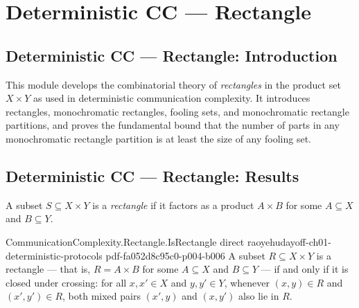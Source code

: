 \section{Deterministic CC --- Rectangle}
\subsection*{Deterministic CC --- Rectangle: Introduction}

This module develops the combinatorial theory of \emph{rectangles} in the product
set $X \times Y$ as used in deterministic communication complexity.  It introduces
rectangles, monochromatic rectangles, fooling sets, and monochromatic rectangle
partitions, and proves the fundamental bound that the number of parts in any
monochromatic rectangle partition is at least the size of any fooling set.

\subsection*{Deterministic CC --- Rectangle: Results}

\begin{definition}[Rectangle]
\label{CommunicationComplexity.Rectangle.IsRectangle}
\leanok
A subset $S \subseteq X \times Y$ is a \emph{rectangle} if it factors as a
product $A \times B$ for some $A \subseteq X$ and $B \subseteq Y$.
\end{definition}

\begin{theorem}
\label{CommunicationComplexity.Rectangle.IsRectangle_iff}
\leanok
{}
\proofstep
  {CommunicationComplexity.Rectangle.IsRectangle}
  {direct}
  {raoyehudayoff-ch01-deterministic-protocols}
  {pdf-fa052d8c95c0-p004-b006}
A subset $R \subseteq X \times Y$ is a rectangle — that is, $R = A \times B$ for some $A
\subseteq X$ and $B \subseteq Y$ — if and only if it is closed under crossing: for all
$x, x' \in X$ and $y, y' \in Y$, whenever $(x, y) \in R$ and $(x', y') \in R$, both
mixed pairs $(x', y)$ and $(x, y')$ also lie in $R$.
\end{theorem}

